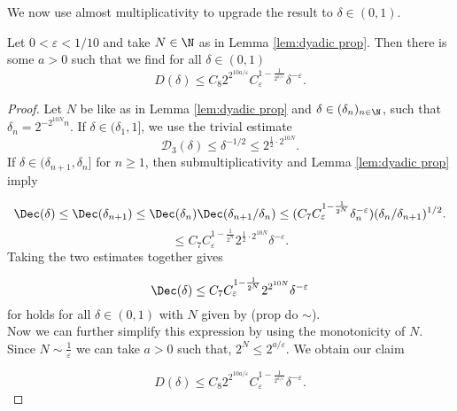 We now use almost multiplicativity to upgrade the result to $\delta \in(0,1)$. 
\begin{lem}\label{lem:iteration prop}
Let $0<\varepsilon<1/10$ and take $N\in\N$ as in Lemma \ref{lem:dyadic prop}. Then there is some $a >0$ such that we find for all $\delta \in (0,1)$
\begin{equation}
\label{eq:IntermediateResultIIMomentCurve}
D(\delta) \leq C_{8} 2^{2^{10 a/\varepsilon}} C_\varepsilon^{1-\frac{1}{2^{a/\varepsilon}}} \delta^{-\varepsilon}.
\end{equation}
\end{lem}

\begin{proof}
Let $N$ be like as in Lemma \ref{lem:dyadic prop} and $\delta \in (\delta_n)_{n\in\N}$, such that $\delta_n = 2^{-2^{10N}n}$. If $\delta \in (\delta_{1},1]$, we use the trivial estimate
\begin{equation*}
\mathcal{D}_3(\delta) \leq \delta^{-1/2} \leq 2^{\frac{1}{2} \cdot 2^{10N}}.
\end{equation*}
If $\delta \in (\delta_{n+1},\delta_n]$ for $n \geq 1$, then submultiplicativity and Lemma \ref{lem:dyadic prop} imply

\begin{equation}
    \Dec(\delta) \leq \Dec(\delta_{n+1}) \leq \Dec(\delta_n)\Dec(\delta_{n+1}/  \delta_n) \leq (C_{7}C_{\varepsilon}^{1-\frac{1}{2^N}} \delta_{n}^{-\varepsilon})(\delta_n / \delta_{n+1})^{1/2}.
\end{equation}
\begin{equation}
    \leq C_{7}C_{\varepsilon}^{1-\frac{1}{2^N}}2^{\frac{1}{2} \cdot 2^{10N}} \delta^{-\varepsilon}.
\end{equation}
Taking the two estimates together gives

\begin{equation*}
    \Dec(\delta) \leq C_{7}C_{\varepsilon}^{1-\frac{1}{2^N}}2^{ 2^{10N}} \delta^{-\varepsilon}
\end{equation*}
for holds for all $\delta \in (0,1)$ with $N$ given by (prop do $\sim$). \\

Now we can further simplify this expression by using the monotonicity of $N$. Since $N \sim \frac{1}{\varepsilon}$ we can take $a>0$ such that, $2^N \leq 2^{a/\varepsilon}$. We obtain our claim

\begin{equation*}
D(\delta) \leq C_{8} 2^{2^{10 a/\varepsilon}} C_\varepsilon^{1-\frac{1}{2^{a/\varepsilon}}} \delta^{-\varepsilon}.
\end{equation*}
\end{proof}

